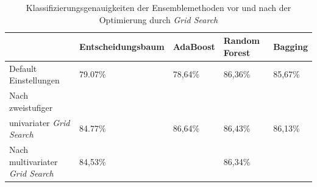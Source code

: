 \begin{table}[h]
	\begin{tabular}{lllll}
		\hline
		& Entscheidungsbaum & AdaBoost & Random Forest & Bagging \\ \hline
		Default Einstellungen         &    79.07\%               &  78,64\%        &  86,36\%             &  85,67\%       \\
		Nach zweistufiger\\
		univariater \emph{Grid Search}   &  84.77\%              &  86,64\%        &        86,43\%       &    86,13\%     \\
		Nach multivariater \emph{Grid Search} &  84,53\%                 &        &   86,34\%              &         \\ \hline
	\end{tabular}
	\caption{\label{table:results_grid} Klassifizierungsgenauigkeiten der Ensemblemethoden vor und nach der Optimierung durch \emph{Grid Search}}
\end{table}
